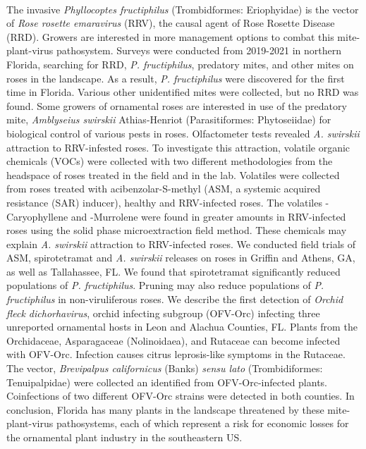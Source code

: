 \documentclass{ufdissertation}[overrideChapters] %
\begin{document}
   \hphantom{forcing a space here} \\
{The invasive \emph{Phyllocoptes fructiphilus} (Trombidformes: Eriophyidae) is the vector of \emph{Rose rosette emaravirus} (RRV), the causal agent of Rose Rosette Disease (RRD). Growers are interested in more management options to combat this mite-plant-virus pathosystem. Surveys were conducted from 2019-2021 in northern Florida, searching for RRD, \emph{P. fructiphilus}, predatory mites, and other mites on roses in the landscape. As a result, \emph{P. fructiphilus} were discovered for the first time in Florida. Various other unidentified mites were collected, but no RRD was found. Some growers of ornamental roses are interested in use of the predatory mite, \emph{Amblyseius swirskii} Athias-Henriot (Parasitiformes: Phytoseiidae) for biological control of various pests in roses. Olfactometer tests revealed \emph{A. swirskii} attraction to RRV-infested roses. To investigate this attraction, volatile organic chemicals (VOCs) were collected with two different methodologies from the headspace of roses treated in the field and in the lab. Volatiles were collected from roses treated with acibenzolar-S-methyl (ASM, a systemic acquired resistance (SAR) inducer), healthy and RRV-infected roses. The volatiles \textbeta-Caryophyllene and \textgamma-Murrolene were found in greater amounts in RRV-infected roses using the solid phase microextraction field method. These chemicals may explain \emph{A. swirskii} attraction to RRV-infected roses. We conducted field trials of ASM, spirotetramat and \emph{A. swirskii} releases on roses in Griffin and Athens, GA, as well as Tallahassee, FL. We found that spirotetramat significantly reduced populations of \emph{P. fructiphilus}. Pruning may also reduce populations of \emph{P. fructiphilus} in non-viruliferous roses. We describe the first detection of \emph{Orchid fleck dichorhavirus}, orchid infecting subgroup (OFV-Orc) infecting three unreported ornamental hosts in Leon and Alachua Counties, FL. Plants from the Orchidaceae, Asparagaceae (Nolinoidaea), and Rutaceae can become infected with OFV-Orc. Infection causes citrus leprosis-like symptoms in the Rutaceae. The vector, \emph{Brevipalpus californicus} (Banks) \emph{sensu lato} (Trombidiformes: Tenuipalpidae) were collected an identified from OFV-Orc-infected plants. Coinfections of two different OFV-Orc strains were detected in both counties. In conclusion, Florida has many plants in the landscape threatened by these mite-plant-virus pathosystems, each of which represent a risk for economic losses for the ornamental plant industry in the southeastern US.}
\end{document}
